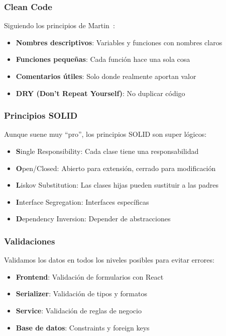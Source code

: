 \subsubsection{Clean Code}

Siguiendo los principios de Martin~\cite{martin2008clean}:
\begin{itemize}
    \item \textbf{Nombres descriptivos}: Variables y funciones con nombres claros
    \item \textbf{Funciones pequeñas}: Cada función hace una sola cosa
    \item \textbf{Comentarios útiles}: Solo donde realmente aportan valor
    \item \textbf{DRY (Don't Repeat Yourself)}: No duplicar código
\end{itemize}

\subsubsection{Principios SOLID}

Aunque suene muy ``pro'', los principios SOLID son super lógicos:
\begin{itemize}
    \item \textbf{S}ingle Responsibility: Cada clase tiene una responsabilidad
    \item \textbf{O}pen/Closed: Abierto para extensión, cerrado para modificación
    \item \textbf{L}iskov Substitution: Las clases hijas pueden sustituir a las padres
    \item \textbf{I}nterface Segregation: Interfaces específicas
    \item \textbf{D}ependency Inversion: Depender de abstracciones
\end{itemize}

\subsubsection{Validaciones}

Validamos los datos en todos los niveles posibles para evitar errores:
\begin{itemize}
    \item \textbf{Frontend}: Validación de formularios con React
    \item \textbf{Serializer}: Validación de tipos y formatos
    \item \textbf{Service}: Validación de reglas de negocio
    \item \textbf{Base de datos}: Constraints y foreign keys
\end{itemize}

